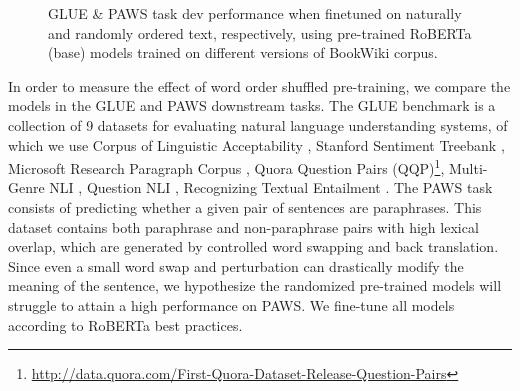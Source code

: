 \documentclass[12pt]{article}
\begin{document}
\begin{figure}[t]
    \centering
    \caption{GLUE \& PAWS task dev performance when finetuned on naturally and randomly ordered text, respectively, using pre-trained RoBERTa (base) models trained on different versions of BookWiki corpus.}
    \label{fig:word_order_glue}
\end{figure}

In order to measure the effect of word order shuffled pre-training, we compare the models in the GLUE and PAWS downstream tasks. The GLUE \cite{wang2018glue} benchmark is a collection of 9 datasets for evaluating natural language understanding systems, of which we use Corpus of Linguistic Acceptability \cite[CoLA,][]{cola_warstadt2019neural}, Stanford Sentiment Treebank \cite[SST,][]{sst2_socher2013recursive}, Microsoft Research Paragraph Corpus \cite[MRPC,][]{mrpc_dolan2005automatically}, Quora Question Pairs (QQP)\footnote{\href{http://data.quora.com/First-Quora-Dataset-Release-Question-Pairs}{http://data.quora.com/First-Quora-Dataset-Release-Question-Pairs}}, Multi-Genre NLI \cite[MNLI,][]{williams-etal-2018-broad}, Question NLI \cite[QNLI,][]{qnli_rajpurkar2016squad, qnli_2_demszky2018transforming}, Recognizing Textual Entailment \cite[RTE,][]{rte1_dagan2005pascal, rte2_haim2006second, rte3_giampiccolo2007third, rte5_bentivogli2009fifth}. The PAWS task \cite{zhang2019paws} consists of predicting whether a given pair of sentences are paraphrases. This dataset contains both paraphrase and non-paraphrase pairs with high lexical overlap, which are generated by controlled word swapping and back translation. Since even a small word swap and perturbation can drastically modify the meaning of the sentence, we hypothesize the randomized pre-trained models will struggle to attain a high performance on PAWS. We fine-tune all models according to RoBERTa best practices.
\end{document}
